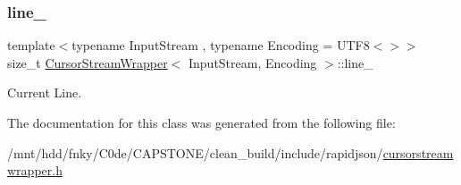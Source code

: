 \subsubsection{\texorpdfstring{line\+\_\+}{line\_}}
{\footnotesize\ttfamily template$<$typename Input\+Stream , typename Encoding  = U\+T\+F8$<$$>$$>$ \\
size\+\_\+t \hyperlink{classCursorStreamWrapper}{Cursor\+Stream\+Wrapper}$<$ Input\+Stream, Encoding $>$\+::line\+\_\+\hspace{0.3cm}{\ttfamily [private]}}



Current Line. 



The documentation for this class was generated from the following file\+:\begin{DoxyCompactItemize}
\item 
/mnt/hdd/fnky/\+C0de/\+C\+A\+P\+S\+T\+O\+N\+E/clean\+\_\+build/include/rapidjson/\hyperlink{cursorstreamwrapper_8h}{cursorstreamwrapper.\+h}\end{DoxyCompactItemize}

